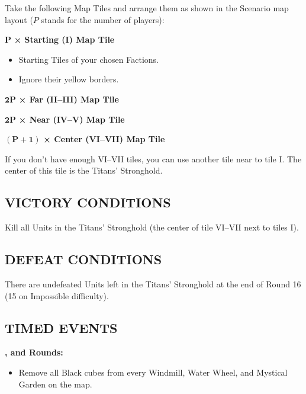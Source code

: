 \begin{multicols*}{2}
Take the following Map Tiles and arrange them as shown in the Scenario map layout ($P$ stands for the number of players):

$\boldsymbol{P}$ \textbf{× Starting (I) Map Tile}
\begin{itemize}
  \item Starting Tiles of your chosen Factions.
  \item Ignore their yellow borders.
\end{itemize}

$\boldsymbol{2 P}$ \textbf{× Far (II--III) Map Tile}

$\boldsymbol{2 P}$ \textbf{× Near (IV--V) Map Tile}

$\boldsymbol{(P + 1)}$ \textbf{× Center (VI--VII) Map Tile}

If you don't have enough VI--VII tiles, you can use another tile near to tile I.
The center of this tile is the Titans' Stronghold.

\subsection*{\MakeUppercase{Victory Conditions}}

Kill all Units in the Titans' Stronghold (the center of tile VI--VII next to tiles I).

\subsection*{\MakeUppercase{Defeat Conditions}}

There are undefeated Units left in the Titans' Stronghold at the end of Round 16 (15 on Impossible difficulty).

\subsection*{\MakeUppercase{Timed Events}}

\textbf{,  and  Rounds:}
\begin{itemize}
  \item Remove all Black cubes from every Windmill, Water Wheel, and Mystical Garden on the map.
\end{itemize}

\vspace*{\fill}\columnbreak


\end{multicols*}
